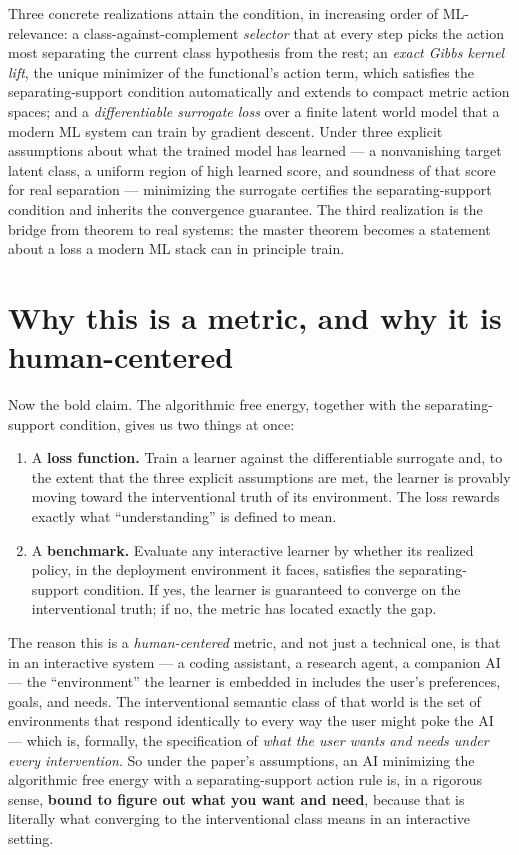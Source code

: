 \documentclass[11pt]{article}
\begin{document}
Three concrete realizations attain the condition, in increasing order of ML-relevance: a class-against-complement \emph{selector} that at every step picks the action most separating the current class hypothesis from the rest; an \emph{exact Gibbs kernel lift}, the unique minimizer of the functional's action term, which satisfies the separating-support condition automatically and extends to compact metric action spaces; and a \emph{differentiable surrogate loss} over a finite latent world model that a modern ML system can train by gradient descent. Under three explicit assumptions about what the trained model has learned --- a nonvanishing target latent class, a uniform region of high learned score, and soundness of that score for real separation --- minimizing the surrogate certifies the separating-support condition and inherits the convergence guarantee. The third realization is the bridge from theorem to real systems: the master theorem becomes a statement about a loss a modern ML stack can in principle train.

\section*{Why this is a metric, and why it is human-centered}

Now the bold claim. The algorithmic free energy, together with the separating-support condition, gives us two things at once:

\begin{enumerate}
\item A \textbf{loss function.} Train a learner against the differentiable surrogate and, to the extent that the three explicit assumptions are met, the learner is provably moving toward the interventional truth of its environment. The loss rewards exactly what ``understanding'' is defined to mean.
\item A \textbf{benchmark.} Evaluate any interactive learner by whether its realized policy, in the deployment environment it faces, satisfies the separating-support condition. If yes, the learner is guaranteed to converge on the interventional truth; if no, the metric has located exactly the gap.
\end{enumerate}

The reason this is a \emph{human-centered} metric, and not just a technical one, is that in an interactive system --- a coding assistant, a research agent, a companion AI --- the ``environment'' the learner is embedded in includes the user's preferences, goals, and needs. The interventional semantic class of that world is the set of environments that respond identically to every way the user might poke the AI --- which is, formally, the specification of \emph{what the user wants and needs under every intervention}. So under the paper's assumptions, an AI minimizing the algorithmic free energy with a separating-support action rule is, in a rigorous sense, \textbf{bound to figure out what you want and need}, because that is literally what converging to the interventional class means in an interactive setting.
\end{document}
